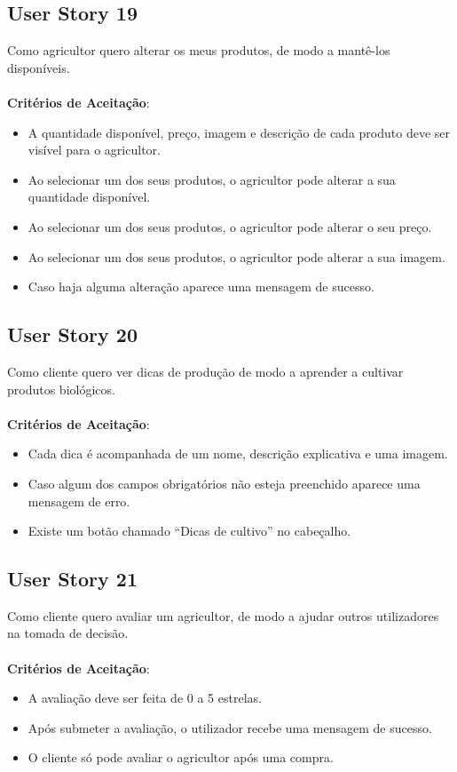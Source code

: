 \documentclass[a4paper,11pt]{article}
\begin{document}
\subsection{User Story 19}
Como agricultor quero alterar os meus produtos, de modo a mantê-los disponíveis.\\\\
\textbf{Critérios de Aceitação}:
\begin{itemize}
  \item A quantidade disponível, preço, imagem e descrição de cada produto deve ser visível para o agricultor.
  \item Ao selecionar um dos seus produtos, o agricultor pode alterar a sua quantidade disponível.
  \item Ao selecionar um dos seus produtos, o agricultor pode alterar o seu preço.
  \item Ao selecionar um dos seus produtos, o agricultor pode alterar a sua imagem.
  \item Caso haja alguma alteração aparece uma mensagem de sucesso.
\end{itemize}
\subsection{User Story 20}
Como cliente quero ver dicas de produção de modo a aprender a cultivar produtos biológicos.\\\\
\textbf{Critérios de Aceitação}:
\begin{itemize}
  \item Cada dica é acompanhada de um nome, descrição explicativa e uma imagem.
  \item Caso algum dos campos obrigatórios não esteja preenchido aparece uma mensagem de erro.
  \item Existe um botão chamado “Dicas de cultivo” no cabeçalho.
\end{itemize}
\subsection{User Story 21}
Como cliente quero avaliar um agricultor, de modo a ajudar outros utilizadores na tomada de decisão.\\\\
\textbf{Critérios de Aceitação}:
\begin{itemize}
  \item A avaliação deve ser feita de 0 a 5 estrelas.
  \item Após submeter a avaliação, o utilizador recebe uma mensagem de sucesso.
  \item O cliente só pode avaliar o agricultor após uma compra.
\end{itemize}
\end{document}
